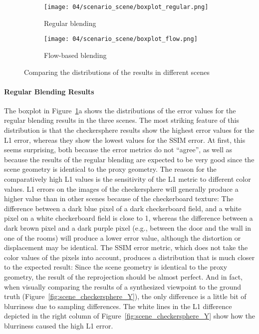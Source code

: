 \begin{figure}
\centering
    \hfill
    \begin{subfigure}[b]{0.49\textwidth}
            \centering
            \texttt{[image: 04/scenario\_scene/boxplot\_regular.png]}
            \caption{Regular blending}
    \end{subfigure}
    \hfill
    \begin{subfigure}[b]{0.49\textwidth}
            \centering
            \texttt{[image: 04/scenario\_scene/boxplot\_flow.png]}
            \caption{Flow-based blending}
    \end{subfigure}
    \hfill
  \caption{Comparing the distributions of the results in different scenes}
  \label{fig:scene_boxplot_split}
\end{figure}

\paragraph{Regular Blending Results}
The boxplot in Figure~\ref{fig:scene_boxplot_split}a shows the distributions of the error values for the regular blending results in the three scenes. The most striking feature of this distribution is that the checkersphere results show the highest error values for the L1 error, whereas they show the lowest values for the SSIM error. At first, this seems surprising, both because the error metrics do not ``agree'', as well as because the results of the regular blending are expected to be very good since the scene geometry is identical to the proxy geometry. The reason for the comparatively high L1 values is the sensitivity of the L1 metric to different color values. L1 errors on the images of the checkersphere will generally produce a higher value than in other scenes because of the checkerboard texture:
The difference between a dark blue pixel of a dark checkerboard field, and a white pixel on a white checkerboard field is close to 1, whereas the difference between a dark brown pixel and a dark purple pixel (e.g., between the door and the wall in one of the rooms) will produce a lower error value, although the distortion or displacement may be identical. The SSIM error metric, which does not take the color values of the pixels into account, produces a distribution that is much closer to the expected result: Since the scene geometry is identical to the proxy geometry, the result of the reprojection should be almost perfect. And in fact, when visually comparing the results of a synthesized viewpoint to the ground truth (Figure~\ref{fig:scene_checkersphere_Y}), the only difference is a little bit of blurriness due to sampling differences. The white lines in the L1 difference depicted in the right column of Figure~\ref{fig:scene_checkersphere_Y} show how the blurriness caused the high L1 error.

